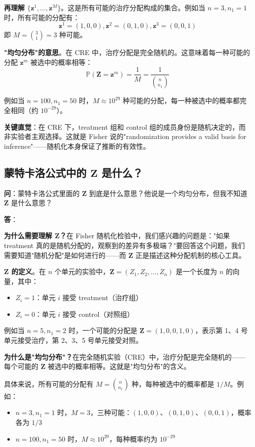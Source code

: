 \textbf{再理解 $\{\mathbf{z}^1, \ldots, \mathbf{z}^M\}$}。这是所有可能的治疗分配构成的集合。例如当 $n=3, n_1=1$ 时，所有可能的分配有：
$$\mathbf{z}^1 = (1,0,0), \mathbf{z}^2 = (0,1,0), \mathbf{z}^3 = (0,0,1)$$
即 $M = \binom{3}{1} = 3$ 种可能。

\textbf{"均匀分布"的意思}。在 CRE 中，治疗分配是完全随机的。这意味着每一种可能的分配 $\mathbf{z}^m$ 被选中的概率相等：
$$\mathbb{P}(\mathbf{Z} = \mathbf{z}^m) = \frac{1}{M} = \frac{1}{\binom{n}{n_1}}$$

例如当 $n=100, n_1=50$ 时，$M \approx 10^{29}$ 种可能的分配，每一种被选中的概率都完全相同（约 $10^{-29}$）。

\textbf{关键直觉}：在 CRE 下，treatment 组和 control 组的成员身份是随机决定的，而非实验者主观选择。这就是 Fisher 说的"randomization provides a valid basis for inference"——随机化本身保证了推断的有效性。

\subsection{蒙特卡洛公式中的 $\mathbf{Z}$ 是什么？}\label{sec:qa-z-in-monte-carlo}

\textbf{问}：蒙特卡洛公式里面的 $\mathbf{Z}$ 到底是什么意思？他说是一个均匀分布，但我不知道 $\mathbf{Z}$ 是什么意思？

\textbf{答}：

\textbf{为什么需要理解 $\mathbf{Z}$？}在 Fisher 随机化检验中，我们感兴趣的问题是："如果 treatment 真的是随机分配的，观察到的差异有多极端？"要回答这个问题，我们需要知道"随机分配"是如何进行的——而 $\mathbf{Z}$ 正是描述这种分配机制的核心工具。

\textbf{$\mathbf{Z}$ 的定义}。在 $n$ 个单元的实验中，$\mathbf{Z} = (Z_1, Z_2, \ldots, Z_n)$ 是一个长度为 $n$ 的向量，其中：
\begin{itemize}
  \item $Z_i = 1$：单元 $i$ 接受 treatment（治疗组）
  \item $Z_i = 0$：单元 $i$ 接受 control（对照组）
\end{itemize}

例如当 $n=5, n_1=2$ 时，一个可能的分配是 $\mathbf{Z} = (1, 0, 0, 1, 0)$，表示第 1、4 号单元接受治疗，第 2、3、5 号单元接受对照。

\textbf{为什么是"均匀分布"？}在完全随机实验（CRE）中，治疗分配是完全随机的——每个可能的 $\mathbf{Z}$ 被选中的概率相等。这就是"均匀分布"的含义。

具体来说，所有可能的分配有 $M = \binom{n}{n_1}$ 种，每种被选中的概率都是 $1/M$。例如：
\begin{itemize}
  \item $n=3, n_1=1$ 时，$M=3$，三种可能：$(1,0,0)$、$(0,1,0)$、$(0,0,1)$，概率各为 $1/3$
  \item $n=100, n_1=50$ 时，$M \approx 10^{29}$，每种概率约为 $10^{-29}$
\end{itemize}

